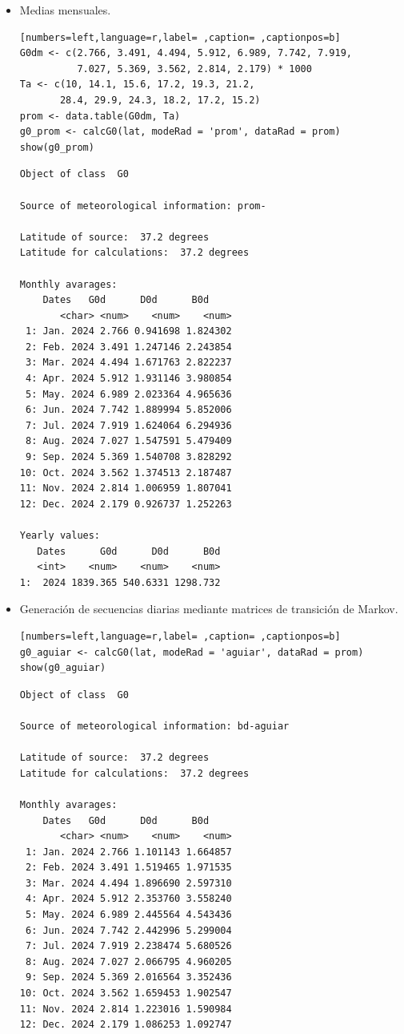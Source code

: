 \begin{itemize}
\item Medias mensuales.
\begin{lstlisting}[numbers=left,language=r,label= ,caption= ,captionpos=b]
G0dm <- c(2.766, 3.491, 4.494, 5.912, 6.989, 7.742, 7.919,
          7.027, 5.369, 3.562, 2.814, 2.179) * 1000
Ta <- c(10, 14.1, 15.6, 17.2, 19.3, 21.2,
       28.4, 29.9, 24.3, 18.2, 17.2, 15.2)
prom <- data.table(G0dm, Ta) 
g0_prom <- calcG0(lat, modeRad = 'prom', dataRad = prom)
show(g0_prom)
\end{lstlisting}

\begin{verbatim}
Object of class  G0 

Source of meteorological information: prom- 

Latitude of source:  37.2 degrees
Latitude for calculations:  37.2 degrees

Monthly avarages:
	Dates   G0d      D0d      B0d
       <char> <num>    <num>    <num>
 1: Jan. 2024 2.766 0.941698 1.824302
 2: Feb. 2024 3.491 1.247146 2.243854
 3: Mar. 2024 4.494 1.671763 2.822237
 4: Apr. 2024 5.912 1.931146 3.980854
 5: May. 2024 6.989 2.023364 4.965636
 6: Jun. 2024 7.742 1.889994 5.852006
 7: Jul. 2024 7.919 1.624064 6.294936
 8: Aug. 2024 7.027 1.547591 5.479409
 9: Sep. 2024 5.369 1.540708 3.828292
10: Oct. 2024 3.562 1.374513 2.187487
11: Nov. 2024 2.814 1.006959 1.807041
12: Dec. 2024 2.179 0.926737 1.252263

Yearly values:
   Dates      G0d      D0d      B0d
   <int>    <num>    <num>    <num>
1:  2024 1839.365 540.6331 1298.732
\end{verbatim}

\item Generación de secuencias diarias mediante matrices de transición de Markov.
\begin{lstlisting}[numbers=left,language=r,label= ,caption= ,captionpos=b]
g0_aguiar <- calcG0(lat, modeRad = 'aguiar', dataRad = prom)
show(g0_aguiar)
\end{lstlisting}

\begin{verbatim}
Object of class  G0 

Source of meteorological information: bd-aguiar 

Latitude of source:  37.2 degrees
Latitude for calculations:  37.2 degrees

Monthly avarages:
	Dates   G0d      D0d      B0d
       <char> <num>    <num>    <num>
 1: Jan. 2024 2.766 1.101143 1.664857
 2: Feb. 2024 3.491 1.519465 1.971535
 3: Mar. 2024 4.494 1.896690 2.597310
 4: Apr. 2024 5.912 2.353760 3.558240
 5: May. 2024 6.989 2.445564 4.543436
 6: Jun. 2024 7.742 2.442996 5.299004
 7: Jul. 2024 7.919 2.238474 5.680526
 8: Aug. 2024 7.027 2.066795 4.960205
 9: Sep. 2024 5.369 2.016564 3.352436
10: Oct. 2024 3.562 1.659453 1.902547
11: Nov. 2024 2.814 1.223016 1.590984
12: Dec. 2024 2.179 1.086253 1.092747


\end{verbatim}
\end{itemize}
